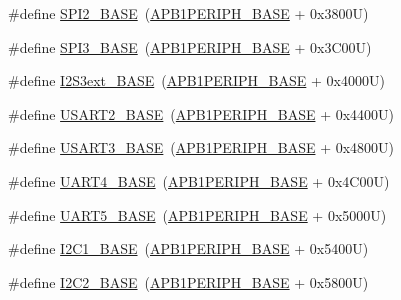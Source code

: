 \begin{DoxyCompactItemize}
\item 
\#define \hyperlink{group___peripheral__memory__map_gac3e357b4c25106ed375fb1affab6bb86}{S\+P\+I2\+\_\+\+B\+A\+SE}~(\hyperlink{group___peripheral__memory__map_ga45666d911f39addd4c8c0a0ac3388cfb}{A\+P\+B1\+P\+E\+R\+I\+P\+H\+\_\+\+B\+A\+SE} + 0x3800\+U)
\item 
\#define \hyperlink{group___peripheral__memory__map_gae634fe8faa6922690e90fbec2fc86162}{S\+P\+I3\+\_\+\+B\+A\+SE}~(\hyperlink{group___peripheral__memory__map_ga45666d911f39addd4c8c0a0ac3388cfb}{A\+P\+B1\+P\+E\+R\+I\+P\+H\+\_\+\+B\+A\+SE} + 0x3\+C00\+U)
\item 
\#define \hyperlink{group___peripheral__memory__map_ga89b61d6e6b09e94f3fccb7bef34e0263}{I2\+S3ext\+\_\+\+B\+A\+SE}~(\hyperlink{group___peripheral__memory__map_ga45666d911f39addd4c8c0a0ac3388cfb}{A\+P\+B1\+P\+E\+R\+I\+P\+H\+\_\+\+B\+A\+SE} + 0x4000\+U)
\item 
\#define \hyperlink{group___peripheral__memory__map_gade83162a04bca0b15b39018a8e8ec090}{U\+S\+A\+R\+T2\+\_\+\+B\+A\+SE}~(\hyperlink{group___peripheral__memory__map_ga45666d911f39addd4c8c0a0ac3388cfb}{A\+P\+B1\+P\+E\+R\+I\+P\+H\+\_\+\+B\+A\+SE} + 0x4400\+U)
\item 
\#define \hyperlink{group___peripheral__memory__map_gabe0d6539ac0026d598274ee7f45b0251}{U\+S\+A\+R\+T3\+\_\+\+B\+A\+SE}~(\hyperlink{group___peripheral__memory__map_ga45666d911f39addd4c8c0a0ac3388cfb}{A\+P\+B1\+P\+E\+R\+I\+P\+H\+\_\+\+B\+A\+SE} + 0x4800\+U)
\item 
\#define \hyperlink{group___peripheral__memory__map_ga94d92270bf587ccdc3a37a5bb5d20467}{U\+A\+R\+T4\+\_\+\+B\+A\+SE}~(\hyperlink{group___peripheral__memory__map_ga45666d911f39addd4c8c0a0ac3388cfb}{A\+P\+B1\+P\+E\+R\+I\+P\+H\+\_\+\+B\+A\+SE} + 0x4\+C00\+U)
\item 
\#define \hyperlink{group___peripheral__memory__map_gaa155689c0e206e6994951dc3cf31052a}{U\+A\+R\+T5\+\_\+\+B\+A\+SE}~(\hyperlink{group___peripheral__memory__map_ga45666d911f39addd4c8c0a0ac3388cfb}{A\+P\+B1\+P\+E\+R\+I\+P\+H\+\_\+\+B\+A\+SE} + 0x5000\+U)
\item 
\#define \hyperlink{group___peripheral__memory__map_gacd72dbffb1738ca87c838545c4eb85a3}{I2\+C1\+\_\+\+B\+A\+SE}~(\hyperlink{group___peripheral__memory__map_ga45666d911f39addd4c8c0a0ac3388cfb}{A\+P\+B1\+P\+E\+R\+I\+P\+H\+\_\+\+B\+A\+SE} + 0x5400\+U)
\item 
\#define \hyperlink{group___peripheral__memory__map_ga04bda70f25c795fb79f163b633ad4a5d}{I2\+C2\+\_\+\+B\+A\+SE}~(\hyperlink{group___peripheral__memory__map_ga45666d911f39addd4c8c0a0ac3388cfb}{A\+P\+B1\+P\+E\+R\+I\+P\+H\+\_\+\+B\+A\+SE} + 0x5800\+U)

\end{DoxyCompactItemize}
